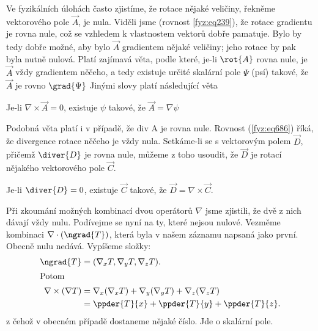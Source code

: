     Ve fyzikálních úlohách často zjistíme, že rotace nějaké veličiny, řekněme vektorového pole 
    \(\vec{A}\), je nula. Viděli jsme (rovnost \ref{fyz:eq239}), že rotace gradientu je rovna 
    nule, což se vzhledem k vlastnostem vektorů dobře pamatuje. Bylo by tedy dobře možné, aby bylo 
    \(\vec{A}\) gradientem nějaké veličiny; jeho rotace by pak byla nutně nulová. Platí zajímavá 
    věta, podle které, je-li \(\rot{A}\) rovna nule, je \(\vec{A}\) vždy gradientem něčeho, a tedy 
    existuje určité skalární pole \(\Psi\) (psí) takové, že \(\vec{A}\) je rovno \(\grad{\Psi}\) 
    Jinými slovy platí následující věta
    \begin{lemma}
      Je-li $\nabla\times\vec{A}=0$, existuje $\psi$ takové, že $\vec{A} = \nabla\psi$
    \end{lemma}
    Podobná věta platí i v případě, že div A je rovna nule. Rovnost (\ref{fyz:eq686}) říká, že
    divergence rotace něčeho je vždy nula. Setkáme-li se s vektorovým polem \(\vec{D}\), přičemž 
    \(\diver{D}\) je rovna nule, můžeme z toho usoudit, že \(\vec{D}\) je rotací nějakého vektorového pole 
    \(\vec{C}\).
    \begin{lemma}
      Je-li $\diver{D} = 0$, existuje $\vec{C}$ takové, že $\vec{D} = \nabla\times\vec{C}$.
    \end{lemma}
    Při zkoumání možných kombinací dvou operátorů \(\nabla\) jsme zjistili, že dvě z nich dávají 
    vždy nulu. Podívejme se nyní na ty, které nejsou nulové. Vezměme kombinaci 
    \(\nabla\cdot(\ngrad{T})\), která byla v našem záznamu napsaná jako první. Obecně nulu nedává. 
    Vypíšeme složky: 
    \begin{align*}
      \ngrad{T}              &= (\nabla_xT, \nabla_yT, \nabla_zT).  \\
      \shortintertext{Potom}
      \nabla\times(\nabla T) &= \nabla_x(\nabla_xT) + \nabla_y(\nabla_yT) + \nabla_z(\nabla_zT)   \\
                             &= \ppder{T}{x} + \ppder{T}{y} + \ppder{T}{z}.
    \end{align*}
    z čehož v obecném případě dostaneme nějaké číslo. Jde o skalární pole. 
  

